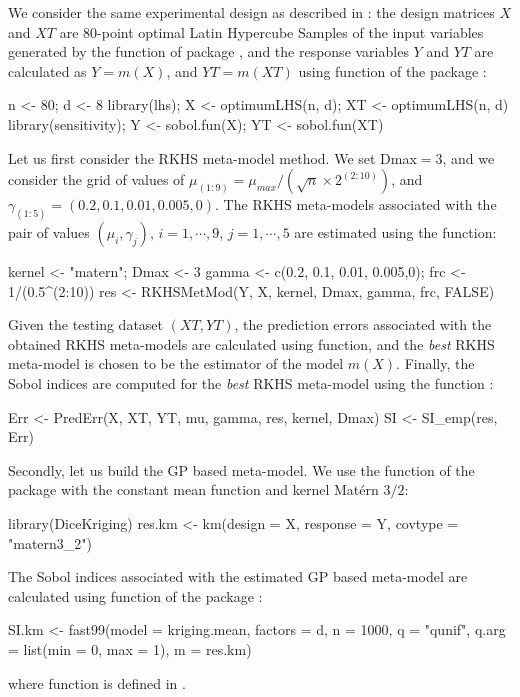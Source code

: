 We consider the same experimental design as described in \citet{JSSv051i01}: the design matrices $X$ and $XT$ are $80$-point optimal Latin Hypercube Samples of the input variables generated by the  function of package , and the response variables $Y$ and $YT$ are calculated as $Y = m(X)$, and $YT = m(XT)$ using  function of the package :
\begin{example}
n <- 80; d <- 8
library(lhs); X <- optimumLHS(n, d); XT <- optimumLHS(n, d)
library(sensitivity); Y <- sobol.fun(X); YT <- sobol.fun(XT)
\end{example}
Let us first consider the RKHS meta-model method. We set Dmax$=3$, and we consider the grid of values of $\mu_{(1:9)}=\mu_{max}/(\sqrt{n}\times 2^{(2:10)})$, and $\gamma_{(1:5)}=(0.2,0.1,0.01,0.005,0)$.  
The RKHS meta-models associated with the pair of values $(\mu_i,\gamma_j)$, $i = 1,\cdots,9$, $j=1,\cdots,5$ are estimated using the  function:
\begin{example}
kernel <- "matern"; Dmax <- 3 
gamma <- c(0.2, 0.1, 0.01, 0.005,0); frc <- 1/(0.5^(2:10))
res <- RKHSMetMod(Y, X, kernel, Dmax, gamma, frc, FALSE)
\end{example}
Given the testing dataset $(XT,YT)$, the prediction errors associated with the obtained RKHS meta-models are calculated using  function, and the \textit{best} RKHS meta-model is chosen to be the estimator of the model $m(X)$. Finally, the Sobol indices are computed for the \textit{best} RKHS meta-model using the function :
\begin{example}
Err <- PredErr(X, XT, YT, mu, gamma, res, kernel, Dmax)
SI <- SI_emp(res, Err)
\end{example}
Secondly, let us build the GP based meta-model. We use the  function of the package  with the constant mean function and kernel Matérn $3/2$:
\begin{example}
library(DiceKriging)
res.km <- km(design = X, response = Y, covtype = "matern3_2")
\end{example}
The Sobol indices associated with the estimated GP based meta-model are calculated using  function of the package :
\begin{example}
SI.km <- fast99(model = kriging.mean, factors = d, n = 1000,
                       q = "qunif", q.arg = list(min = 0, max = 1), m = res.km)
\end{example}
where  function is defined in \citet{JSSv051i01}. 

